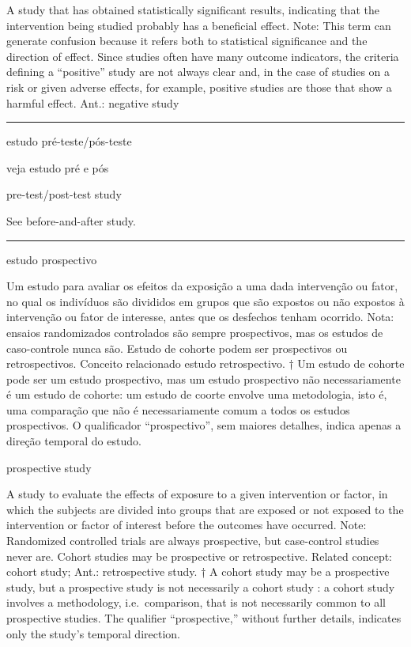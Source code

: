 \documentclass[
]{book}
\begin{document}
A study that has obtained statistically significant results, indicating that the intervention being studied probably has a beneficial effect. Note: This term can generate confusion because it refers both to statistical significance and the direction of effect. Since studies often have many outcome indicators, the criteria defining a ``positive'' study are not always clear and, in the case of studies on a risk or given adverse effects, for example, positive studies are those that show a harmful effect. Ant.: negative study

\begin{center}\rule{0.5\linewidth}{0.5pt}\end{center}

estudo pré-teste/pós-teste

veja estudo pré e pós

pre-test/post-test study

See before-and-after study.

\begin{center}\rule{0.5\linewidth}{0.5pt}\end{center}

estudo prospectivo

Um estudo para avaliar os efeitos da exposição a uma dada intervenção ou fator, no qual os indivíduos são divididos em grupos que são expostos ou não expostos à intervenção ou fator de interesse, antes que os desfechos tenham ocorrido. Nota: ensaios randomizados controlados são sempre prospectivos, mas os estudos de caso-controle nunca são. Estudo de cohorte podem ser prospectivos ou retrospectivos. Conceito relacionado estudo retrospectivo. † Um estudo de cohorte pode ser um estudo prospectivo, mas um estudo prospectivo não necessariamente é um estudo de cohorte: um estudo de coorte envolve uma metodologia, isto é, uma comparação que não é necessariamente comum a todos os estudos prospectivos. O qualificador ``prospectivo'', sem maiores detalhes, indica apenas a direção temporal do estudo.

prospective study

A study to evaluate the effects of exposure to a given intervention or factor, in which the subjects are divided into groups that are exposed or not exposed to the intervention or factor of interest before the outcomes have occurred. Note: Randomized controlled trials are always prospective, but case-control studies never are. Cohort studies may be prospective or retrospective. Related concept: cohort study; Ant.: retrospective study. † A cohort study may be a prospective study, but a prospective study is not necessarily a cohort study : a cohort study involves a methodology, i.e.~comparison, that is not necessarily common to all prospective studies. The qualifier ``prospective,'' without further details, indicates only the study's temporal direction.
\end{document}
